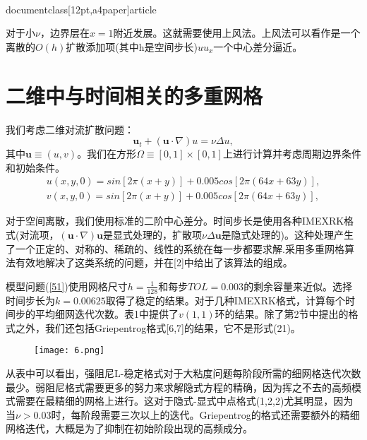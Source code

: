 \\documentclass[12pt,a4paper]{article}
\begin{document}
对于小$\nu $，边界层在$x =1$附近发展。这就需要使用上风法。上风法可以看作是一个离散的$O(h)$扩散添加项(其中h是空间步长)$uu_{x}$一个中心差分逼近。

\section{二维中与时间相关的多重网格}

我们考虑二维对流扩散问题：
\begin{equation}
\mathbf{u}_{t}+(\mathbf{u}\cdot\nabla)u=\nu \Delta u,
\label{51}
\end{equation}
其中$\mathbf{u}\equiv (u,v)$。我们在方形$\varOmega\equiv [0,1]\times [0,1]$上进行计算并考虑周期边界条件和初始条件。
\begin{gather*}
u(x,y,0)=sin[2\pi (x+y)]+0.005cos[2\pi (64x+63y)],\\
v(x,y,0)=sin[2\pi (x+y)]+0.005cos[2\pi (64x+63y)],
\end{gather*}

对于空间离散，我们使用标准的二阶中心差分。时间步长是使用各种IMEXRK格式(对流项，$(\mathbf{u}\cdot\nabla)\mathbf{u}$是显式处理的，扩散项$\nu \Delta\mathbf{u}$是隐式处理的)。这种处理产生了一个正定的、对称的、稀疏的、线性的系统在每一步都要求解.采用多重网格算法有效地解决了这类系统的问题，并在[2]中给出了该算法的组成。

模型问题(\ref{51})使用网格尺寸$h=\frac{1}{128}$和每步$TOL=0.003$的剩余容量来近似。选择时间步长为$k=0.00625$取得了稳定的结果。对于几种IMEXRK格式，计算每个时间步的平均细网迭代次数。表1中提供了$v(1,1)$环的结果。除了第2节中提出的格式之外，我们还包括Griepentrog格式[6,7]的结果，它不是形式(21)。

\begin{figure}[H]
\texttt{[image: 6.png]}
\centering
\label{Table1}
\end{figure}

从表中可以看出，强阻尼L-稳定格式对于大粘度问题每阶段所需的细网格迭代次数最少。弱阻尼格式需要更多的努力来求解隐式方程的精确，因为挥之不去的高频模式需要在最精细的网格上进行。这对于隐式-显式中点格式(1,2,2)尤其明显，因为当$\nu >0.03$时，每阶段需要三次以上的迭代。Griepentrog的格式还需要额外的精细网格迭代，大概是为了抑制在初始阶段出现的高频成分。
\end{document}
